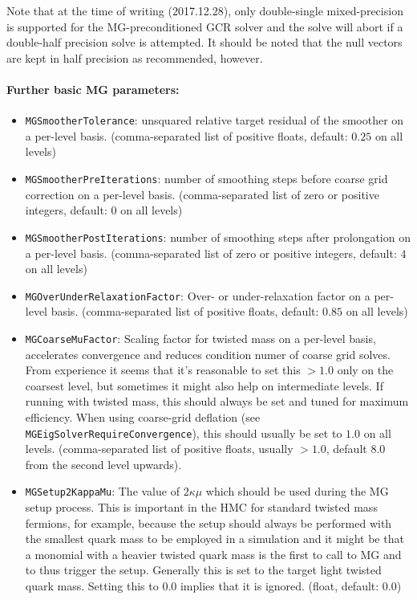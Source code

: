 Note that at the time of writing (2017.12.28), only double-single mixed-precision is supported for the MG-preconditioned GCR solver and the solve will abort if a double-half precision solve is attempted. It should be noted that the null vectors are kept in half precision as recommended, however.

\paragraph{Further basic MG parameters:}
\begin{itemize}
  \item{ \texttt{MGSmootherTolerance}: unsquared relative target residual of the smoother on a per-level basis. (comma-separated list of positive floats, default: $0.25$ on all levels) }
  \item{ \texttt{MGSmootherPreIterations}: number of smoothing steps before coarse grid correction on a per-level basis. (comma-separated list of zero or positive integers, default: $0$ on all levels)}
  \item{ \texttt{MGSmootherPostIterations}: number of smoothing steps after prolongation on a per-level basis. (comma-separated list of zero or positive integers, default: $4$ on all levels)}
  \item{ \texttt{MGOverUnderRelaxationFactor}: Over- or under-relaxation factor on a per-level basis. (comma-separated list of positive floats, default: $0.85$ on all levels)}
  \item{ \texttt{MGCoarseMuFactor}: Scaling factor for twisted mass on a per-level basis, accelerates convergence and reduces condition numer of coarse grid solves. From experience it seems that it's reasonable to set this $>1.0$ only on the coarsest level, but sometimes it might also help on intermediate levels. If running with twisted mass, this should always be set and tuned for maximum efficiency. When using coarse-grid deflation (see \texttt{MGEigSolverRequireConvergence}), this should usually be set to $1.0$ on all levels. (comma-separated list of positive floats, usually $ > 1.0$, default $8.0$ from the second level upwards).}
  \item{ \texttt{MGSetup2KappaMu}: The value of $2\kappa\mu$ which should be used during the MG setup process. This is important in the HMC for standard twisted mass fermions, for example, because the setup should always be performed with the smallest quark mass to be employed in a simulation and it might be that a monomial with a heavier twisted quark mass is the first to call to MG and to thus trigger the setup. Generally this is set to the target light twisted quark mass. Setting this to $0.0$ implies that it is ignored. (float, default: $0.0$) }

\end{itemize}
